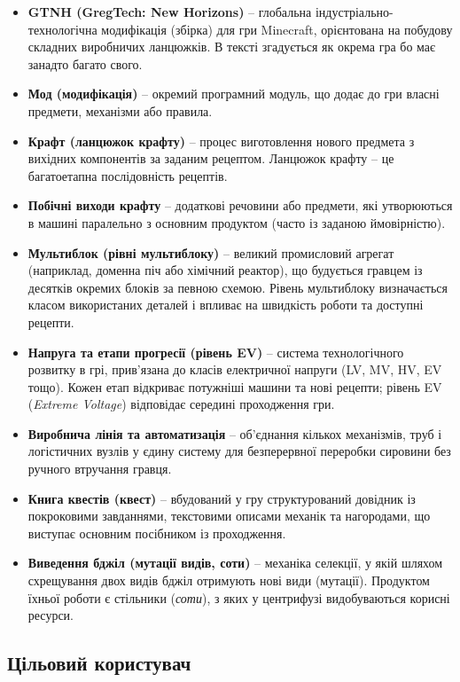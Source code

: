 \begin{itemize}[wide]
    \item \textbf{GTNH (GregTech: New Horizons)} -- глобальна індустріально-технологічна модифікація (збірка) для гри Minecraft, орієнтована на побудову складних виробничих ланцюжків. В тексті згадується як окрема гра бо має занадто багато свого.
    \item \textbf{Мод (модифікація)} -- окремий програмний модуль, що додає до гри власні предмети, механізми або правила.
    \item \textbf{Крафт (ланцюжок крафту)} -- процес виготовлення нового предмета з вихідних компонентів за заданим рецептом. Ланцюжок крафту -- це багатоетапна послідовність рецептів.
    \item \textbf{Побічні виходи крафту} -- додаткові речовини або предмети, які утворюються в машині паралельно з основним продуктом (часто із заданою ймовірністю).
    \item \textbf{Мультиблок (рівні мультиблоку)} -- великий промисловий агрегат (наприклад, доменна піч або хімічний реактор), що будується гравцем із десятків окремих блоків за певною схемою. Рівень мультиблоку визначається класом використаних деталей і впливає на швидкість роботи та доступні рецепти.
    \item \textbf{Напруга та етапи прогресії (рівень EV)} -- система технологічного розвитку в грі, прив'язана до класів електричної напруги (LV, MV, HV, EV тощо). Кожен етап відкриває потужніші машини та нові рецепти; рівень EV (\textit{Extreme Voltage}) відповідає середині проходження гри.
    \item \textbf{Виробнича лінія та автоматизація} -- об'єднання кількох механізмів, труб і логістичних вузлів у єдину систему для безперервної переробки сировини без ручного втручання гравця.
    \item \textbf{Книга квестів (квест)} -- вбудований у гру структурований довідник із покроковими завданнями, текстовими описами механік та нагородами, що виступає основним посібником із проходження.
    \item \textbf{Виведення бджіл (мутації видів, соти)} -- механіка селекції, у якій шляхом схрещування двох видів бджіл отримують нові види (мутації). Продуктом їхньої роботи є стільники (\textit{соти}), з яких у центрифузі видобуваються корисні ресурси.
\end{itemize}

\subsection{Цільовий користувач}

